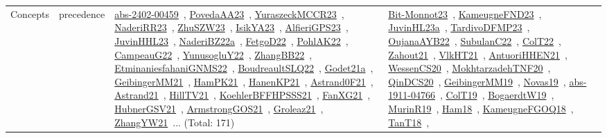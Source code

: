 {\begin{longtable}{lp{3cm}>{\raggedright\arraybackslash}p{6cm}>{\raggedright\arraybackslash}p{6cm}>{\raggedright\arraybackslash}p{8cm}}
Concepts & precedence & \href{works/abs-2402-00459.pdf}{abs-2402-00459}~\cite{abs-2402-00459}, \href{works/PovedaAA23.pdf}{PovedaAA23}~\cite{PovedaAA23}, \href{works/YuraszeckMCCR23.pdf}{YuraszeckMCCR23}~\cite{YuraszeckMCCR23}, \href{works/NaderiRR23.pdf}{NaderiRR23}~\cite{NaderiRR23}, \href{works/ZhuSZW23.pdf}{ZhuSZW23}~\cite{ZhuSZW23}, \href{works/IsikYA23.pdf}{IsikYA23}~\cite{IsikYA23}, \href{works/AlfieriGPS23.pdf}{AlfieriGPS23}~\cite{AlfieriGPS23}, \href{works/JuvinHHL23.pdf}{JuvinHHL23}~\cite{JuvinHHL23}, \href{works/NaderiBZ22a.pdf}{NaderiBZ22a}~\cite{NaderiBZ22a}, \href{works/FetgoD22.pdf}{FetgoD22}~\cite{FetgoD22}, \href{works/PohlAK22.pdf}{PohlAK22}~\cite{PohlAK22}, \href{works/CampeauG22.pdf}{CampeauG22}~\cite{CampeauG22}, \href{works/YunusogluY22.pdf}{YunusogluY22}~\cite{YunusogluY22}, \href{works/ZhangBB22.pdf}{ZhangBB22}~\cite{ZhangBB22}, \href{works/EtminaniesfahaniGNMS22.pdf}{EtminaniesfahaniGNMS22}~\cite{EtminaniesfahaniGNMS22}, \href{works/BoudreaultSLQ22.pdf}{BoudreaultSLQ22}~\cite{BoudreaultSLQ22}, \href{works/Godet21a.pdf}{Godet21a}~\cite{Godet21a}, \href{works/GeibingerMM21.pdf}{GeibingerMM21}~\cite{GeibingerMM21}, \href{works/HamPK21.pdf}{HamPK21}~\cite{HamPK21}, \href{works/HanenKP21.pdf}{HanenKP21}~\cite{HanenKP21}, \href{works/Astrand0F21.pdf}{Astrand0F21}~\cite{Astrand0F21}, \href{works/Astrand21.pdf}{Astrand21}~\cite{Astrand21}, \href{works/HillTV21.pdf}{HillTV21}~\cite{HillTV21}, \href{works/KoehlerBFFHPSSS21.pdf}{KoehlerBFFHPSSS21}~\cite{KoehlerBFFHPSSS21}, \href{works/FanXG21.pdf}{FanXG21}~\cite{FanXG21}, \href{works/HubnerGSV21.pdf}{HubnerGSV21}~\cite{HubnerGSV21}, \href{works/ArmstrongGOS21.pdf}{ArmstrongGOS21}~\cite{ArmstrongGOS21}, \href{works/Groleaz21.pdf}{Groleaz21}~\cite{Groleaz21}, \href{works/ZhangYW21.pdf}{ZhangYW21}~\cite{ZhangYW21}... (Total: 171) & \href{works/Bit-Monnot23.pdf}{Bit-Monnot23}~\cite{Bit-Monnot23}, \href{works/KameugneFND23.pdf}{KameugneFND23}~\cite{KameugneFND23}, \href{works/JuvinHL23a.pdf}{JuvinHL23a}~\cite{JuvinHL23a}, \href{works/TardivoDFMP23.pdf}{TardivoDFMP23}~\cite{TardivoDFMP23}, \href{works/OujanaAYB22.pdf}{OujanaAYB22}~\cite{OujanaAYB22}, \href{works/SubulanC22.pdf}{SubulanC22}~\cite{SubulanC22}, \href{works/ColT22.pdf}{ColT22}~\cite{ColT22}, \href{works/Zahout21.pdf}{Zahout21}~\cite{Zahout21}, \href{works/VlkHT21.pdf}{VlkHT21}~\cite{VlkHT21}, \href{works/AntuoriHHEN21.pdf}{AntuoriHHEN21}~\cite{AntuoriHHEN21}, \href{works/WessenCS20.pdf}{WessenCS20}~\cite{WessenCS20}, \href{works/MokhtarzadehTNF20.pdf}{MokhtarzadehTNF20}~\cite{MokhtarzadehTNF20}, \href{works/QinDCS20.pdf}{QinDCS20}~\cite{QinDCS20}, \href{works/GeibingerMM19.pdf}{GeibingerMM19}~\cite{GeibingerMM19}, \href{works/Novas19.pdf}{Novas19}~\cite{Novas19}, \href{works/abs-1911-04766.pdf}{abs-1911-04766}~\cite{abs-1911-04766}, \href{works/ColT19.pdf}{ColT19}~\cite{ColT19}, \href{works/BogaerdtW19.pdf}{BogaerdtW19}~\cite{BogaerdtW19}, \href{works/MurinR19.pdf}{MurinR19}~\cite{MurinR19}, \href{works/Ham18.pdf}{Ham18}~\cite{Ham18}, \href{works/KameugneFGOQ18.pdf}{KameugneFGOQ18}~\cite{KameugneFGOQ18}, \href{works/TanT18.pdf}{TanT18}~\cite{TanT18}, 
\end{longtable}}
